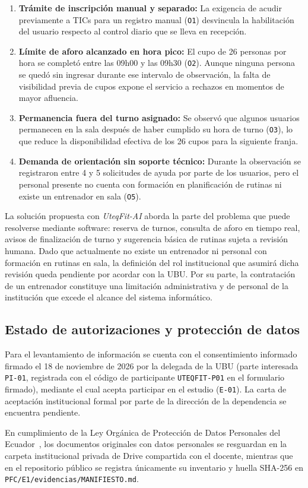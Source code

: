 \begin{enumerate}
    \item \textbf{Trámite de inscripción manual y separado:} La exigencia de acudir previamente a TICs para un registro manual (\texttt{O1}) desvincula la habilitación del usuario respecto al control diario que se lleva en recepción.
    \item \textbf{Límite de aforo alcanzado en hora pico:} El cupo de 26 personas por hora se completó entre las 09h00 y las 09h30 (\texttt{O2}). Aunque ninguna persona se quedó sin ingresar durante ese intervalo de observación, la falta de visibilidad previa de cupos expone el servicio a rechazos en momentos de mayor afluencia.
    \item \textbf{Permanencia fuera del turno asignado:} Se observó que algunos usuarios permanecen en la sala después de haber cumplido su hora de turno (\texttt{O3}), lo que reduce la disponibilidad efectiva de los 26 cupos para la siguiente franja.
    \item \textbf{Demanda de orientación sin soporte técnico:} Durante la observación se registraron entre 4 y 5 solicitudes de ayuda por parte de los usuarios, pero el personal presente no cuenta con formación en planificación de rutinas ni existe un entrenador en sala (\texttt{O5}).
\end{enumerate}

La solución propuesta con \textit{UteqFit-AI} aborda la parte del problema que puede resolverse mediante software: reserva de turnos, consulta de aforo en tiempo real, avisos de finalización de turno y sugerencia básica de rutinas sujeta a revisión humana. Dado que actualmente no existe un entrenador ni personal con formación en rutinas en sala, la definición del rol institucional que asumirá dicha revisión queda pendiente por acordar con la UBU. Por su parte, la contratación de un entrenador constituye una limitación administrativa y de personal de la institución que excede el alcance del sistema informático.

\subsection{Estado de autorizaciones y protección de datos}

Para el levantamiento de información se cuenta con el consentimiento informado firmado el 18 de noviembre de 2026 por la delegada de la UBU (parte interesada \texttt{PI-01}, registrada con el código de participante \texttt{UTEQFIT-P01} en el formulario firmado), mediante el cual acepta participar en el estudio (\texttt{E-01}). La carta de aceptación institucional formal por parte de la dirección de la dependencia se encuentra pendiente.

En cumplimiento de la Ley Orgánica de Protección de Datos Personales del Ecuador~\cite{lopdp2021}, los documentos originales con datos personales se resguardan en la carpeta institucional privada de Drive compartida con el docente, mientras que en el repositorio público se registra únicamente su inventario y huella SHA-256 en \texttt{PFC/E1/evidencias/MANIFIESTO.md}.
